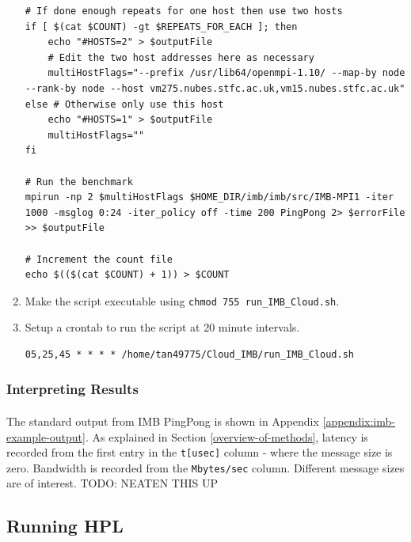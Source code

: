 \documentclass{article}
\newenvironment{code}{\captionsetup{type=listing}}{}
\begin{document}
\begin{enumerate}
\begin{code}
\begin{verbatim}
# If done enough repeats for one host then use two hosts
if [ $(cat $COUNT) -gt $REPEATS_FOR_EACH ]; then
    echo "#HOSTS=2" > $outputFile
    # Edit the two host addresses here as necessary
    multiHostFlags="--prefix /usr/lib64/openmpi-1.10/ --map-by node  --rank-by node --host vm275.nubes.stfc.ac.uk,vm15.nubes.stfc.ac.uk"
else # Otherwise only use this host
    echo "#HOSTS=1" > $outputFile
    multiHostFlags=""
fi

# Run the benchmark
mpirun -np 2 $multiHostFlags $HOME_DIR/imb/imb/src/IMB-MPI1 -iter 1000 -msglog 0:24 -iter_policy off -time 200 PingPong 2> $errorFile >> $outputFile

# Increment the count file
echo $(($(cat $COUNT) + 1)) > $COUNT
                    \end{verbatim}
                    \end{code}
                \item Make the script executable using \texttt{chmod 755 run_IMB_Cloud.sh}.
                \item Setup a crontab to run the script at 20 minute intervals.

                    \begin{verbatim}
05,25,45 * * * * /home/tan49775/Cloud_IMB/run_IMB_Cloud.sh
                    \end{verbatim}
            \end{enumerate}

        \subsubsection{Interpreting Results}
            \paragraph{}
            The standard output from IMB PingPong is shown in Appendix \ref{appendix:imb-example-output}. As explained in Section \ref{overview-of-methods}, latency is recorded from the first entry in the \verb|t[usec]| column - where the message size is zero. Bandwidth is recorded from the \verb|Mbytes/sec| column. Different message sizes are of interest.
            TODO: NEATEN THIS UP





    \subsection{Running HPL}
\end{document}
